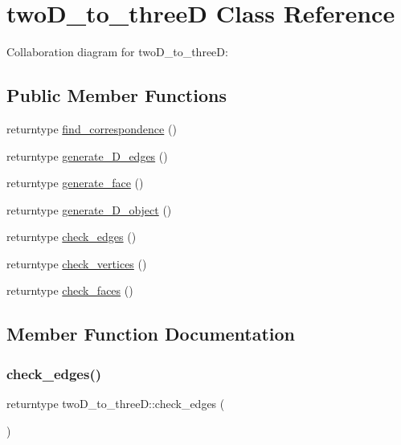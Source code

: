 \hypertarget{classtwoD__to__threeD}{}\section{two\+D\+\_\+to\+\_\+threeD Class Reference}
\label{classtwoD__to__threeD}


Collaboration diagram for two\+D\+\_\+to\+\_\+threeD\+:
\subsection*{Public Member Functions}
\begin{DoxyCompactItemize}
\item 
returntype \hyperlink{classtwoD__to__threeD_a18411d2d15bff47be2d709dc65681332}{find\+\_\+correspondence} ()
\item 
returntype \hyperlink{classtwoD__to__threeD_a4aa1b891f73475589a3278bf06eb3813}{generate\+\_\+D\+\_\+edges} ()
\item 
returntype \hyperlink{classtwoD__to__threeD_a654dd311058fcb4e155a6f6303605d1d}{generate\+\_\+face} ()
\item 
returntype \hyperlink{classtwoD__to__threeD_abd66b5a812873b0b4694482b26e7698c}{generate\+\_\+D\+\_\+object} ()
\item 
returntype \hyperlink{classtwoD__to__threeD_a6cd16bd23d7f167befdbca13a833be66}{check\+\_\+edges} ()
\item 
returntype \hyperlink{classtwoD__to__threeD_a3e501c816e4c3b6106f1f9190be2975f}{check\+\_\+vertices} ()
\item 
returntype \hyperlink{classtwoD__to__threeD_adee1061487b16954b2596aff1f23999a}{check\+\_\+faces} ()
\end{DoxyCompactItemize}


\subsection{Member Function Documentation}
\mbox{\label{classtwoD__to__threeD_a6cd16bd23d7f167befdbca13a833be66}} 
\subsubsection{\texorpdfstring{check\+\_\+edges()}{check\_edges()}}
{\footnotesize\ttfamily returntype two\+D\+\_\+to\+\_\+three\+D\+::check\+\_\+edges (\begin{DoxyParamCaption}{ }\end{DoxyParamCaption})\hspace{0.3cm}{\ttfamily [inline]}}

